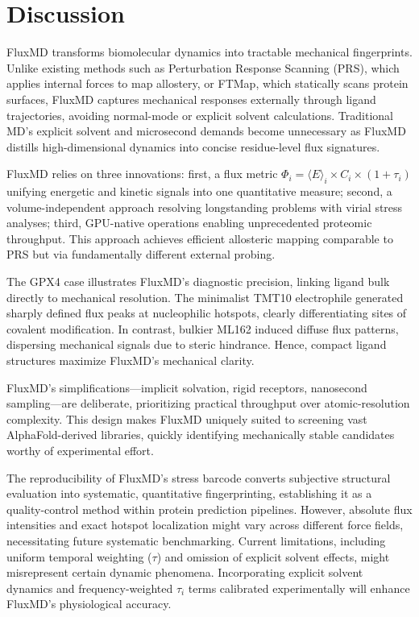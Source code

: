 \documentclass[pdflatex,sn-mathphys-num]{sn-jnl}
\begin{document}
\section*{Discussion}

FluxMD transforms biomolecular dynamics into tractable mechanical fingerprints. Unlike existing methods such as Perturbation Response Scanning (PRS)\cite{Atilgan2010}, which applies internal forces to map allostery, or FTMap\cite{Kozakov2015}, which statically scans protein surfaces, FluxMD captures mechanical responses externally through ligand trajectories, avoiding normal-mode or explicit solvent calculations. Traditional MD's explicit solvent and microsecond demands become unnecessary as FluxMD distills high-dimensional dynamics into concise residue-level flux signatures.

FluxMD relies on three innovations: first, a flux metric $\Phi_i = \langle E \rangle_i \times C_i \times (1 + \tau_i)$ unifying energetic and kinetic signals into one quantitative measure; second, a volume-independent approach resolving longstanding problems with virial stress analyses; third, GPU-native operations enabling unprecedented proteomic throughput. This approach achieves efficient allosteric mapping comparable to PRS but via fundamentally different external probing.

The GPX4 case illustrates FluxMD's diagnostic precision, linking ligand bulk directly to mechanical resolution. The minimalist TMT10 electrophile generated sharply defined flux peaks at nucleophilic hotspots, clearly differentiating sites of covalent modification. In contrast, bulkier ML162 induced diffuse flux patterns, dispersing mechanical signals due to steric hindrance. Hence, compact ligand structures maximize FluxMD's mechanical clarity.

FluxMD's simplifications—implicit solvation, rigid receptors, nanosecond sampling—are deliberate, prioritizing practical throughput over atomic-resolution complexity. This design makes FluxMD uniquely suited to screening vast AlphaFold-derived libraries, quickly identifying mechanically stable candidates worthy of experimental effort.

The reproducibility of FluxMD's stress barcode converts subjective structural evaluation into systematic, quantitative fingerprinting, establishing it as a quality-control method within protein prediction pipelines. However, absolute flux intensities and exact hotspot localization might vary across different force fields, necessitating future systematic benchmarking. Current limitations, including uniform temporal weighting ($\tau$) and omission of explicit solvent effects, might misrepresent certain dynamic phenomena. Incorporating explicit solvent dynamics and frequency-weighted $\tau_i$ terms calibrated experimentally will enhance FluxMD's physiological accuracy.
\end{document}
